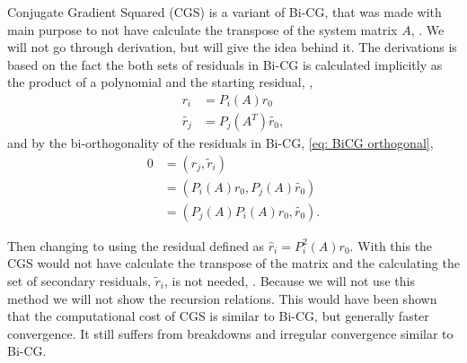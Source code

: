 Conjugate Gradient Squared (CGS) is a variant of Bi-CG, that was made with main purpose to not have calculate the transpose of the system matrix \(A\), \cite{Saad2003}. We will not go through derivation, but will give the idea behind it. The derivations is based on the fact the both sets of residuals in Bi-CG is calculated implicitly as the product of a polynomial and the starting residual, \cite{Vorst03},
\begin{align*}
    r_i&=P_i(A)r_0\\
    \tilde{r_j}&=P_j(A^T)\tilde{r_0},
\end{align*}
and by the bi-orthogonality of the residuals in Bi-CG, \eqref{eq: BiCG orthogonal},
\begin{align*}
    0&=(r_j, \tilde{r}_i)\\
    &=(P_i(A)r_0,P_j(A)\tilde{r_0})\\
    &=(P_j(A)P_i(A)r_0,\tilde{r_0}).
\end{align*}

Then changing to using the residual defined as \(\hat{r}_i=P_i^2(A)r_0\). With this the CGS would not have calculate the transpose of the matrix and the calculating the set of secondary residuals, \(\tilde{r}_i\), is not needed, \cite{Vorst03}. Because we will not use this method we will not show the recursion relations. This would have been shown that the computational cost of CGS is similar to Bi-CG, but generally faster convergence. It still suffers from breakdowns and irregular convergence similar to Bi-CG.

